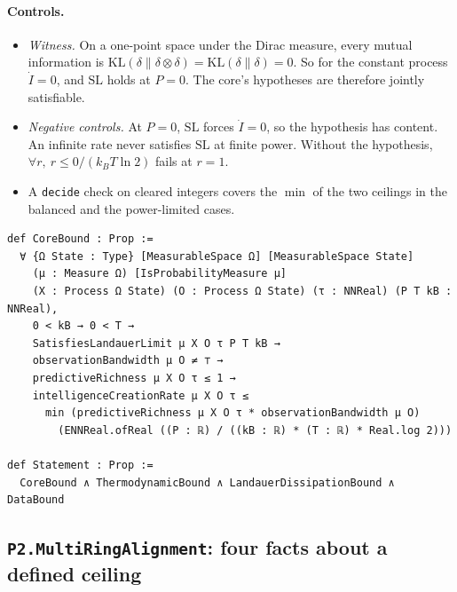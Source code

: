 \documentclass[11pt]{article}
\theoremstyle{definition}
\theoremstyle{remark}
\begin{document}
\paragraph{Controls.}
\begin{itemize}
\item \emph{Witness.} On a one-point space under the Dirac measure, every mutual information is
$\mathrm{KL}(\delta\|\delta\otimes\delta)=\mathrm{KL}(\delta\|\delta)=0$. So for the constant process $\dot I=0$, and
$\mathrm{SL}$ holds at $P=0$. The core's hypotheses are therefore jointly satisfiable.
\item \emph{Negative controls.} At $P=0$, $\mathrm{SL}$ forces $\dot I=0$, so the hypothesis has content. An infinite rate
never satisfies $\mathrm{SL}$ at finite power. Without the hypothesis, $\forall r,\ r\le 0/(k_BT\ln2)$ fails at $r=1$.
\item A \texttt{decide} check on cleared integers covers the $\min$ of the two ceilings in the balanced and the power-limited
cases.
\end{itemize}
\begin{lstlisting}
def CoreBound : Prop :=
  ∀ {Ω State : Type} [MeasurableSpace Ω] [MeasurableSpace State]
    (μ : Measure Ω) [IsProbabilityMeasure μ]
    (X : Process Ω State) (O : Process Ω State) (τ : NNReal) (P T kB : NNReal),
    0 < kB → 0 < T →
    SatisfiesLandauerLimit μ X O τ P T kB →
    observationBandwidth μ O ≠ ⊤ →
    predictiveRichness μ X O τ ≤ 1 →
    intelligenceCreationRate μ X O τ ≤
      min (predictiveRichness μ X O τ * observationBandwidth μ O)
        (ENNReal.ofReal ((P : ℝ) / ((kB : ℝ) * (T : ℝ) * Real.log 2)))

def Statement : Prop :=
  CoreBound ∧ ThermodynamicBound ∧ LandauerDissipationBound ∧ DataBound
\end{lstlisting}

\subsection{\texttt{P2.MultiRingAlignment}: four facts about a defined ceiling}
\end{document}
